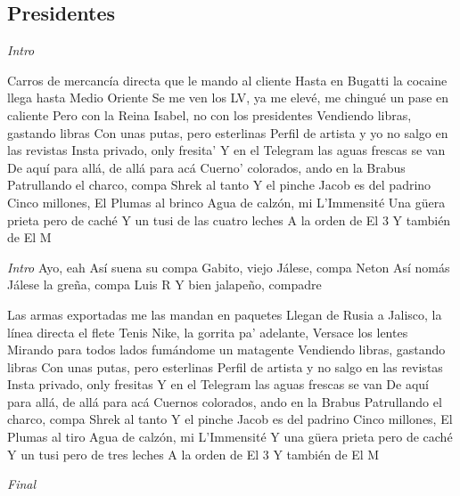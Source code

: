 \subsection{Presidentes}
\noindent

\vspace{1cm}

\begin{guitar}
	\begin{multicols}{2}
		\textit{Intro}

	Carros de mercancía directa que le mando al cliente
	Hasta en Bugatti la cocaine llega hasta Medio Oriente
	Se me ven los LV, ya me elevé, me chingué un pase en caliente
	Pero con la Reina Isabel, no con los presidentes
	Vendiendo libras, gastando libras
	Con unas putas, pero esterlinas
	Perfil de artista y yo no salgo en las revistas
	Insta privado, only fresita'
	Y en el Telegram las aguas frescas se van
	De aquí para allá, de allá para acá
	Cuerno' colorados, ando en la Brabus
	Patrullando el charco, compa Shrek al tanto
	Y el pinche Jacob es del padrino
	Cinco millones, El Plumas al brinco
	Agua de calzón, mi L'Immensité
	Una güera prieta pero de caché
	Y un tusi de las cuatro leches
	A la orden de El 3
	Y también de El M
	\par
	\textit{Intro}
	Ayo, eah
	Así suena su compa Gabito, viejo
	Jálese, compa Neton
	Así nomás
	Jálese la greña, compa Luis R
	Y bien jalapeño, compadre

	\par
	Las armas exportadas me las mandan en paquetes
	Llegan de Rusia a Jalisco, la línea directa el flete
	Tenis Nike, la gorrita pa' adelante, Versace los lentes
	Mirando para todos lados fumándome un matagente
	Vendiendo libras, gastando libras
	Con unas putas, pero esterlinas
	Perfil de artista y no salgo en las revistas
	Insta privado, only fresitas
	Y en el Telegram las aguas frescas se van
	De aquí para allá, de allá para acá
	Cuernos colorados, ando en la Brabus
	Patrullando el charco, compa Shrek al tanto
	Y el pinche Jacob es del padrino
	Cinco millones, El Plumas al tiro
	Agua de calzón, mi L'Immensité
	Y una güera prieta pero de caché
	Y un tusi pero de tres leches
	A la orden de El 3
	Y también de El M


		\textit{Final}
	\end{multicols}
\end{guitar}
